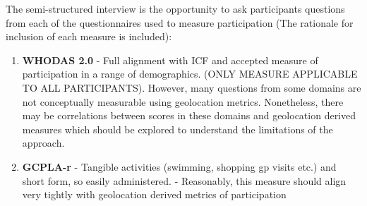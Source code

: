 The semi-structured interview is the opportunity to ask participants questions from each of the questionnaires used to measure participation (The rationale for inclusion of each measure is included):
    
\begin{enumerate}
        \item \textbf{WHODAS 2.0} - Full alignment with ICF and accepted measure of participation in a range of demographics. (ONLY MEASURE APPLICABLE TO ALL PARTICIPANTS). However, many questions from some domains are not conceptually measurable using geolocation metrics. Nonetheless, there may be correlations between scores in these domains and geolocation derived measures which should be explored to understand the limitations of the approach.
        \item  \textbf{GCPLA-r} - Tangible activities (swimming, shopping gp visits etc.) and short form, so easily administered. - Reasonably, this measure should align very tightly with geolocation derived metrics of participation
    \end{enumerate}

    
